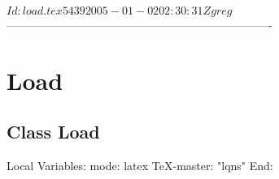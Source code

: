 \C 
\C $Id: load.tex 5439 2005-01-02 02:30:31Z greg $
\C 
\C
\C ----------------------------------------------------------------------
\section{Load}
\label{sec:load}

\subsection{Class Load}
\C Local Variables: 
\C mode: latex
\C TeX-master: "lqns"
\C End: 
